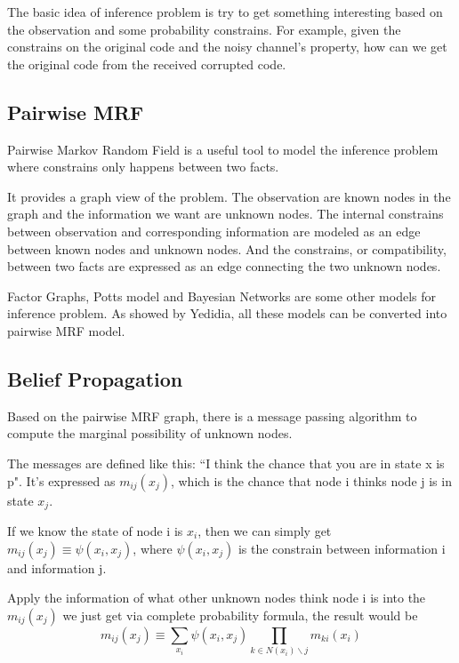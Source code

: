 
The basic idea of inference problem is try to get something interesting based on 
the observation and some probability constrains.
For example, given the constrains on the original code and the noisy channel's property, how can we get the original code from the received corrupted code.

\subsection{Pairwise MRF}
Pairwise Markov Random Field is a useful tool to model the inference problem where constrains only happens between two facts.

It provides a graph view of the problem.
The observation are known nodes in the graph and the information we want are unknown nodes.
The internal constrains between observation and corresponding information are modeled as an edge between known nodes and unknown nodes.
And the constrains, or compatibility, between two facts are expressed as an edge connecting the two unknown nodes.

Factor Graphs, Potts model and Bayesian Networks are some other models for inference problem.
As showed by Yedidia\cite{Yedidia:2003:UBP}, all these models can be converted into pairwise MRF model.

\subsection{Belief Propagation}
Based on the pairwise MRF graph, there is a message passing algorithm to compute the marginal possibility of unknown nodes.

The messages are defined like this: ``I think the chance that you are in state x is p".
It's expressed as $m_{ij}(x_j)$, which is the chance that node i thinks node j is in state $x_j$.

If we know the state of node i is $x_i$, then we can simply get $m_{ij}(x_j) \equiv \psi(x_i, x_j)$, where $\psi(x_i, x_j)$
is the constrain between information i and information j.

Apply the information of what other unknown nodes think node i is into the $m_{ij}(x_j)$ we just get via complete probability formula, the result would be
$$m_{ij}(x_j) \equiv \sum_{x_i} {\psi(x_i, x_j) \prod_{k \in N(x_i) \backslash j}{m_{ki}(x_i)}}$$

